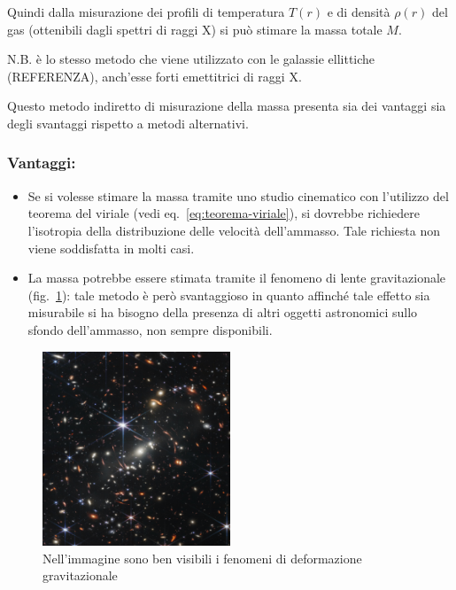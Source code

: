 Quindi dalla misurazione dei profili di temperatura $T(r)$ e di densità $\rho(r)$ del gas (ottenibili dagli spettri di raggi X) si può stimare la massa totale $M$. 

\noindent N.B. è lo stesso metodo che viene utilizzato con le galassie ellittiche (REFERENZA), anch’esse forti emettitrici di raggi X.

Questo metodo indiretto di misurazione della massa presenta sia dei vantaggi sia degli svantaggi rispetto a metodi alternativi.

\subsubsection{\textbf{Vantaggi:}} 
\begin{itemize}
    \item Se si volesse stimare la massa tramite uno studio cinematico con l'utilizzo del teorema del viriale (vedi eq.~\ref{eq:teorema-viriale}), si dovrebbe richiedere l'isotropia della distribuzione delle velocità dell'ammasso. Tale richiesta non viene soddisfatta in molti casi. 
    \item La massa potrebbe essere stimata tramite il fenomeno di lente gravitazionale (fig.~\ref{fig:lensing}): tale metodo è però svantaggioso in quanto affinché tale effetto sia misurabile si ha bisogno della presenza di altri oggetti astronomici sullo sfondo dell’ammasso, non sempre disponibili.
\end{itemize} 

\begin{figure}
    \centering
    \includegraphics[width = 0.5\textwidth]{immagini/lensing.png}
    \caption{Nell'immagine sono ben visibili i fenomeni di deformazione gravitazionale}
    \label{fig:lensing}
\end{figure}

